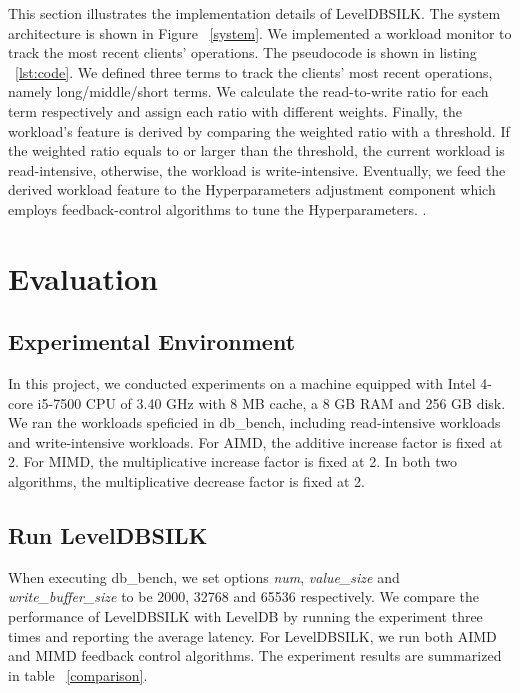 \documentclass[letter,twocolumn,10pt]{article}
\begin{document}
\label{sec:implementaion}
This section illustrates the implementation details of LevelDBSILK. The system architecture is shown in Figure ~\ref{system}. We implemented a workload monitor to track the most recent clients' operations. The pseudocode is shown in listing ~\ref{lst:code}. We defined three terms to track the clients' most recent operations, namely long/middle/short terms. We calculate the read-to-write ratio for each term respectively and assign each ratio with different weights. Finally, the workload's feature is derived by comparing the weighted ratio with a threshold. If the weighted ratio equals to or larger than the threshold, the current workload is read-intensive, otherwise, the workload is write-intensive. Eventually, we feed the derived workload feature to the Hyperparameters adjustment component which employs feedback-control algorithms to tune the Hyperparameters. .


\section{Evaluation}
\label{sec:evaluation}
\subsection {Experimental Environment}
In this project, we conducted experiments on a machine equipped with Intel 4-core i5-7500 CPU of 3.40 GHz with 8 MB cache, a 8 GB RAM and 256 GB disk. We ran the workloads speficied in \textsf{db\_bench}, including read-intensive workloads and write-intensive workloads. For AIMD, the additive increase factor is fixed at 2. For MIMD, the multiplicative increase factor is fixed at 2. In both two algorithms, the multiplicative decrease factor is fixed at 2.

\subsection {Run LevelDBSILK}
When executing \textsf{db\_bench}, we set options \textit{num}, \textit{value\_size} and \textit{write\_buffer\_size} to be 2000, 32768 and 65536 respectively. We compare the performance of LevelDBSILK with LevelDB by running the experiment three times and reporting the average latency. For LevelDBSILK, we run both AIMD and MIMD feedback control algorithms. The experiment results are summarized in table ~\ref{comparison}.
\end{document}
